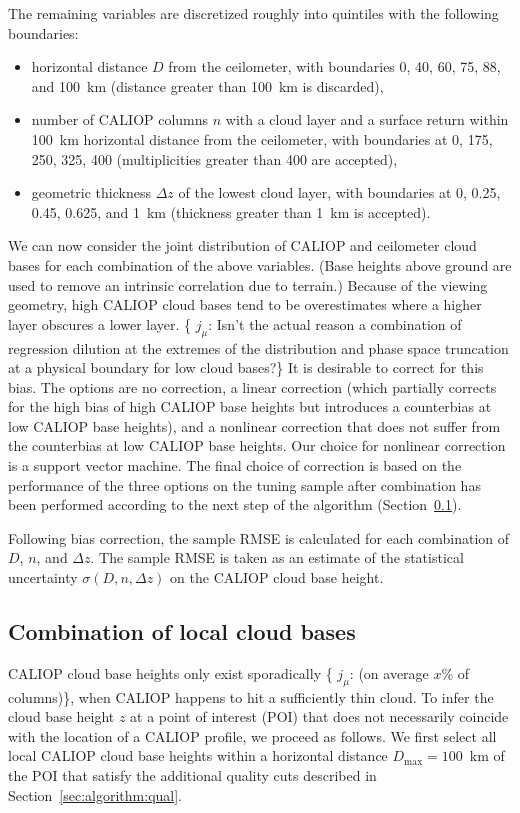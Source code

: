\documentclass[amt,manuscript]{copernicus}\usepackage[]{graphicx}\usepackage[]{color}
\newcommand{\hlnum}[1]{\textcolor[rgb]{0.686,0.059,0.569}{#1}}%
\newcommand\comment[2]{\{\hlnum{ \textit{#1}: #2}\}}
\newcommand\commentjm[1]{\comment{$j_\mu$}{#1}}
\begin{document}
The remaining variables are discretized roughly into quintiles with the
following boundaries:
\begin{itemize}
\item horizontal distance $D$ from the ceilometer, with boundaries 0, 40, 60,
  75, 88, and 100~km (distance greater than 100~km is discarded),
\item number of CALIOP columns $n$ with a cloud layer and a surface return
  within 100~km horizontal distance from the ceilometer, with boundaries at 0,
  175, 250, 325, 400 (multiplicities greater than 400 are accepted),
\item geometric thickness $\Delta z$ of the lowest cloud layer, with boundaries
  at 0, 0.25, 0.45, 0.625, and 1~km (thickness greater than 1~km is accepted).
\end{itemize}

We can now consider the joint distribution of CALIOP and ceilometer cloud bases
for each combination of the above variables.  (Base heights above ground are
used to remove an intrinsic correlation due to terrain.)  Because of the viewing
geometry, high CALIOP cloud bases tend to be overestimates where a higher layer
obscures a lower layer.  \commentjm{Isn't the actual reason a combination of
  regression dilution at the extremes of the distribution and phase space
  truncation at a physical boundary for low cloud bases?}  It is desirable to
correct for this bias.  The options are no correction, a linear correction
(which partially corrects for the high bias of high CALIOP base heights but
introduces a counterbias at low CALIOP base heights), and a nonlinear correction
that does not suffer from the counterbias at low CALIOP base heights.  Our
choice for nonlinear correction is a support vector machine.  The final choice
of correction is based on the performance of the three options on the tuning
sample after combination has been performed according to the next step of the
algorithm (Section~\ref{sec:algorithm:combination}).

Following bias correction, the sample RMSE is calculated for each combination of
$D$, $n$, and $\Delta z$.  The sample RMSE is taken as an estimate of the
statistical uncertainty $\sigma(D,n,\Delta z)$ on the CALIOP cloud base height.

\subsection{Combination of local cloud bases}
\label{sec:algorithm:combination}
CALIOP cloud base heights only exist sporadically \commentjm{(on average $x$\%
  of columns)}, when CALIOP happens to hit a sufficiently thin cloud.  To infer
the cloud base height $z$ at a point of interest (POI) that does not necessarily
coincide with the location of a CALIOP profile, we proceed as follows.  We first
select all local CALIOP cloud base heights within a horizontal distance
$D_\text{max} = 100$~km of the POI that satisfy the additional quality cuts
described in Section~\ref{sec:algorithm:qual}.
\end{document}
